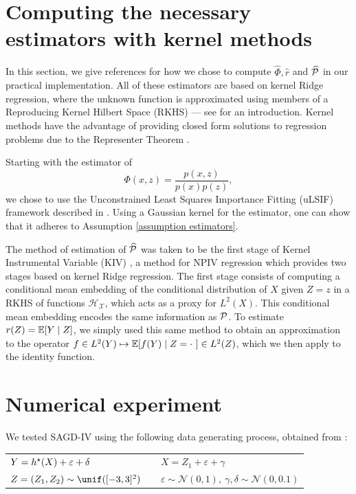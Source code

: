 \section{Computing the necessary estimators with kernel methods}
\label{sec: kernel methods}

In this section, we give references for how we chose to compute $ \hat{ \Phi }, \hat{ r } $ and $ \widehat{ \mathcal{P} } $ in our practical implementation.
All of these estimators are based on kernel Ridge regression, where the unknown function is approximated using members of a Reproducing Kernel Hilbert Space (RKHS) --- see \cite[Chapter~4]{svm2008} for an introduction. 
Kernel methods have the advantage of providing closed form solutions to regression problems due to the Representer Theorem \cite[Theorem~1]{representer2001}.

Starting with the estimator of
\begin{equation*}
    \Phi ( x, z ) = \frac{ p ( x, z ) }{ p ( x ) p ( z ) }
,\end{equation*}
we chose to use the Unconstrained Least Squares Importance Fitting (uLSIF) framework described in \cite[Chapter~6]{sugiyama2012}.
Using a Gaussian kernel for the estimator, one can show that it adheres to Assumption \ref{assumption estimators}.

The method of estimation of $ \widehat{ \mathcal{P} } $ was taken to be the first stage of Kernel Instrumental Variable (KIV) \cite{singh2019}, a method for NPIV regression which provides two stages based on kernel Ridge regression.
The first stage consists of computing a conditional mean embedding \cite{cme2009} of the conditional distribution of $ X $ given $ Z = z $ in a RKHS of functions $ \mathcal{H}_{ \mathcal{X} } $, which acts as a proxy for $ L^2 ( X ) $.
This conditional mean embedding encodes the same information as $ \mathcal{P} $.
To estimate $ r ( Z ) = \mathbb{E} [ Y \mid Z ] $, we simply used this same method to obtain an approximation to the operator $ f \in L^2 ( Y ) \mapsto \mathbb{E} [ f ( Y ) \mid Z = \cdot \ ] \in L^2 ( Z ) $, which we then apply to the identity function.

\section{Numerical experiment}

We tested SAGD-IV using the following data generating process, obtained from \cite{deepgmm2019}:

\begin{tabular}{lcl}
    $ Y = h^{ \star } ( X ) + \varepsilon + \delta $ & &
    $ X = Z_{ 1 } + \varepsilon + \gamma $ \\
    $ Z = ( Z_{ 1 }, Z_{ 2 } ) \sim \unif ( [-3, 3]^2 ) $ & &
    $ \varepsilon \sim \mathcal{N} ( 0, 1 ), \ \gamma, \delta \sim \mathcal{N} ( 0, 0.1 ) $
\end{tabular}

